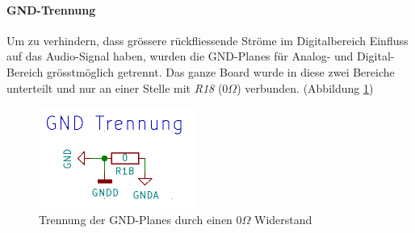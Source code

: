 \paragraph{GND-Trennung}
Um zu verhindern, dass grössere rückfliessende Ströme im Digitalbereich Einfluss auf das Audio-Signal haben, wurden die GND-Planes für Analog- und Digital-Bereich grösstmöglich getrennt. Das ganze Board wurde in diese zwei Bereiche unterteilt und nur an einer Stelle mit \textit{R18} ($0\Omega$) verbunden. (Abbildung \ref{fig:Schema_GND})

\begin{figure} [H]
\begin{center}
 \includegraphics[scale=0.5]{../graphics/Schema_GND.png} 
\caption{Trennung der GND-Planes durch einen $0\Omega$ Widerstand}
\label{fig:Schema_GND}
\end{center}
\end{figure}



 